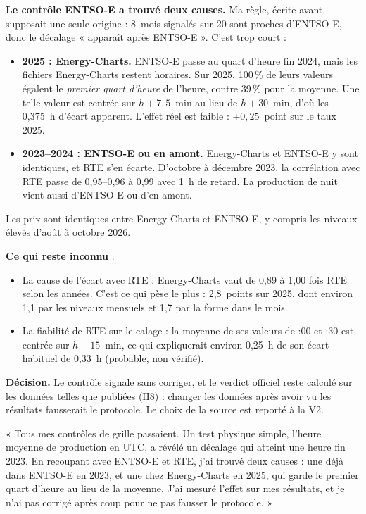 \documentclass[11pt,a4paper]{article}
\begin{document}
\textbf{Le contrôle ENTSO-E a trouvé deux causes.} Ma règle, écrite avant, supposait une seule origine : 8~mois signalés sur 20 sont proches d'ENTSO-E, donc le décalage « apparaît après ENTSO-E ». C'est trop court :
\begin{itemize}
\item \textbf{2025 : Energy-Charts.} ENTSO-E passe au quart d'heure fin 2024, mais les fichiers Energy-Charts restent horaires. Sur 2025, 100\,\% de leurs valeurs égalent le \emph{premier quart d'heure} de l'heure, contre 39\,\% pour la moyenne. Une telle valeur est centrée sur $h + 7{,}5$~min au lieu de $h + 30$~min, d'où les 0,375~h d'écart apparent. L'effet réel est faible : $+0{,}25$~point sur le taux 2025.
\item \textbf{2023--2024 : ENTSO-E ou en amont.} Energy-Charts et ENTSO-E y sont identiques, et RTE s'en écarte. D'octobre à décembre 2023, la corrélation avec RTE passe de 0,95--0,96 à 0,99 avec 1~h de retard. La production de nuit vient aussi d'ENTSO-E ou d'en amont.
\end{itemize}
Les prix sont identiques entre Energy-Charts et ENTSO-E, y compris les niveaux élevés d'août à octobre 2026.

\textbf{Ce qui reste inconnu} :
\begin{itemize}
\item La cause de l'écart avec RTE : Energy-Charts vaut de 0,89 à 1,00 fois RTE selon les années. C'est ce qui pèse le plus : 2,8~points sur 2025, dont environ 1,1 par les niveaux mensuels et 1,7 par la forme dans le mois.
\item La fiabilité de RTE sur le calage : la moyenne de ses valeurs de :00 et :30 est centrée sur $h + 15$~min, ce qui expliquerait environ 0,25~h de son écart habituel de 0,33~h (probable, non vérifié).
\end{itemize}

\textbf{Décision.} Le contrôle signale sans corriger, et le verdict officiel reste calculé sur les données telles que publiées (H8) : changer les données après avoir
vu les résultats fausserait le protocole. Le choix de la source est reporté à la V2.

\begin{entretien}
« Tous mes contrôles de grille passaient. Un test physique simple, l'heure moyenne de production en UTC, a révélé un décalage qui atteint une heure fin 2023. En recoupant avec ENTSO-E et RTE, j'ai trouvé deux causes : une déjà dans ENTSO-E en 2023, et une chez Energy-Charts en 2025, qui garde le premier quart d'heure au lieu de la moyenne. J'ai mesuré l'effet sur mes résultats, et je n'ai pas corrigé après coup pour ne pas fausser le protocole. »
\end{entretien}
\end{document}
